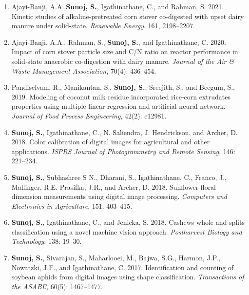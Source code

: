 \documentclass[11pt]{article}
\begin{document}
\begin{enumerate} [itemsep=-0.5ex]

\item Ajayi-Banji, A.A.,\textbf{Sunoj, S.}, Igathinathane, C., and Rahman, S. 2021. Kinetic studies of alkaline-pretreated corn stover co-digested with upset dairy manure under solid-state. \textit{Renewable Energy}. 161, 2198--2207.

\item Ajayi-Banji, A.A., Rahman, S., \textbf{Sunoj, S.}, and Igathinathane, C. 2020. Impact of corn stover particle size and C/N ratio on reactor performance in solid-state anaerobic co-digestion with dairy manure. \textit{Journal of the Air \& Waste Management Association}, 70(4): 436--454. 

\item Pandiselvam, R., Manikantan, S., \textbf{Sunoj, S.}, Sreejith, S., and Beegum, S., 2019. Modeling of coconut milk residue incorporated rice‐corn extrudates properties using multiple linear regression and artificial neural network. \textit{Journal of Food Process Engineering}, 42(2): e12981. 

\item \textbf{Sunoj, S.}, Igathinathane, C., N. Saliendra, J. Hendrickson, and Archer, D. 2018. Color calibration of digital images for agricultural and other applications. \textit{ISPRS Journal of Photogrammetry and Remote Sensing}, 146: 221--234. 

\item \textbf{Sunoj, S.}, Subhashree S N., Dharani, S., Igathinathane, C., Franco, J., Mallinger, R.E. Prasifka, J.R., and Archer, D. 2018. Sunflower floral dimension measurements using digital image processing. \textit{Computers and Electronics in Agriculture}, 151: 403--415. 

\item \textbf{Sunoj, S.}, Igathinathane, C., and Jenicka, S. 2018. Cashews whole and splits classification using a novel machine vision approach. \textit{Postharvest Biology and Technology}, 138: 19--30. 

\item \textbf{Sunoj, S.}, Sivarajan, S., Maharlooei, M., Bajwa, S.G., Harmon, J.P., Nowatzki, J.F., and Igathinathane, C. 2017. Identification and counting of soybean aphids from digital images using shape classification. \textit{Transactions of the ASABE}, 60(5): 1467--1477. 


\end{enumerate}
\end{document}
